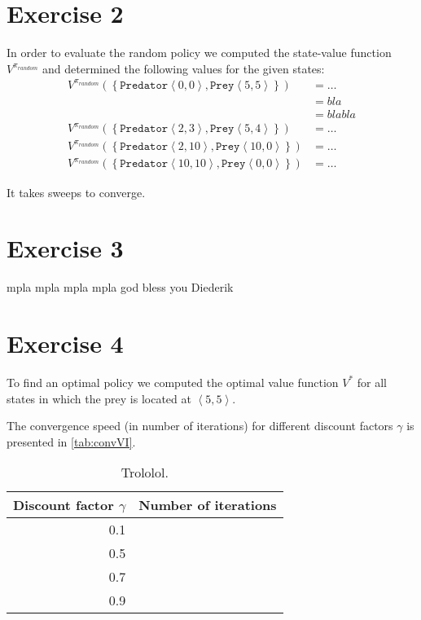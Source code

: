 \documentclass[a4paper,11pt]{article}
\newcommand{\Pred}[2]{\ensuremath{\mathtt{Predator}\left<#1, #2\right>}}
\newcommand{\Prey}[2]{\ensuremath{\mathtt{Prey}\left<#1, #2\right>}}
\newcommand{\DrawSmallPred}[2]{\node at (A.center #1 #2) {$\pi$};}
\newcommand{\DrawSmallPrey}[2]{\node at (A.center #1 #2) {P};}
\begin{document}
\section*{Exercise 2}
In order to evaluate the random policy we computed the state-value function $V^{\pi_{random}}$ and determined the following values for the given states:\\

\begin{align*}
V^{\pi_{random}}(\left\{\Pred{0}{0},\Prey{5}{5}\right\}) & = \ldots \\
&= bla \\
&= blabla\\
    V^{\pi_{random}}(\left\{\Pred{2}{3},\Prey{5}{4}\right\}) &= \ldots \\
    V^{\pi_{random}}(\left\{\Pred{2}{10},\Prey{10}{0}\right\}) &= \ldots \\
    V^{\pi_{random}}(\left\{\Pred{10}{10},\Prey{0}{0}\right\}) &= \ldots
\end{align*}

It takes %
sweeps to converge.



\section*{Exercise 3}
mpla mpla mpla mpla god bless you Diederik
\begin{figure}
\begin{center}
\end{center}
\end{figure}

\section*{Exercise 4}
To find an optimal policy we computed the optimal value function $V^\ast$ for all states in which the prey is located at $\left<5,5\right>$.

The convergence speed (in number of iterations) for different discount factors $\gamma$ is presented in \autoref{tab:convVI}.
\begin{table}
\caption{Trololol.}
\label{tab:convVI}
\begin{center}
\begin{tabular}{|@{ }r@{ }|@{ }r@{ }|}
\hline
Discount factor $\gamma$ & Number of iterations \\
           \hline
0.1 & \\
0.5 & \\
0.7 & \\
0.9 & \\
\hline
\end{tabular}
\end{center}
\end{table}
\end{document}

